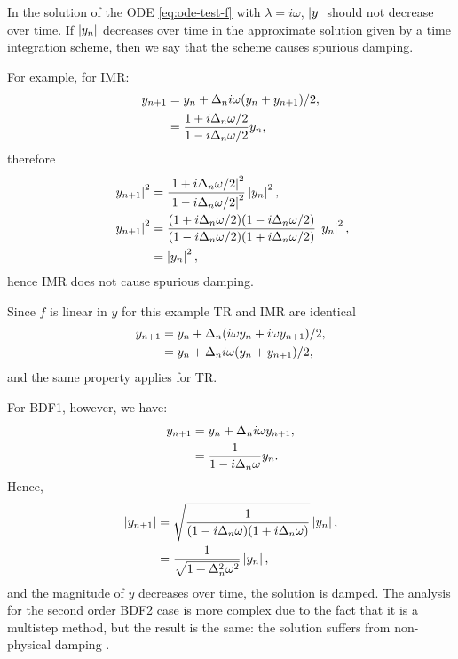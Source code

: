 In the solution of the ODE \cref{eq:ode-test-f} with $\lambda = i\omega$, $\left|{y} \right|$ should not decrease over time.
If $\left|{y_n} \right|$ decreases over time in the approximate solution given by a time integration scheme, then we say that the scheme causes spurious damping.

For example, for IMR:
\begin{equation}
  \begin{aligned}
    y_{n+1} &= y_n + \Delta_{n} i \omega (y_n + y_{n+1})/2, \\
    &= \frac{1 + i\Delta_{n} \omega/2}{1 - i\Delta_{n} \omega/2} y_n,
  \end{aligned}
\end{equation}
therefore
\begin{equation}
  \begin{aligned}
    \left|{y_{n+1}} \right|^2 &=  \frac{\left|{1 + i\Delta_{n} \omega/2} \right|^2}{\left|{1 - i\Delta_{n} \omega/2} \right|^2} \left|{y_n} \right|^2, \\
    \left|{y_{n+1}} \right|^2 &=  \frac{(1 + i\Delta_{n} \omega/2)(1 - i\Delta_{n} \omega/2)}
    {(1 - i\Delta_{n} \omega/2)(1 + i\Delta_{n} \omega/2)} \left|{y_n} \right|^2, \\
    &=  \left|{y_n} \right|^2,
  \end{aligned}
\end{equation}
hence IMR does not cause spurious damping.

Since $f$ is linear in $y$ for this example TR and IMR are identical
\begin{equation}
  \begin{aligned}
    y_{n+1} &= y_n + \Delta_{n}(i\omega y_n + i\omega y_{n+1})/2, \\
    &= y_n + \Delta_{n} i \omega (y_n + y_{n+1})/2,
  \end{aligned} 
\end{equation}
and the same property applies for TR.

For BDF1, however, we have:
\begin{equation}
  \begin{aligned}
    y_{n+1} &= y_n + \Delta_{n} i \omega y_{n+1}, \\
    &= \frac{1}{1 - i \Delta_{n} \omega} y_n.
  \end{aligned}
\end{equation}
Hence,
\begin{equation}
  \begin{aligned}
    \left|{y_{n+1}} \right| &= \sqrt{ \frac{1}{(1 - i \Delta_{n} \omega)(1 + i \Delta_{n} \omega)}} \left|{y_n} \right|, \\
    &= \frac{1}{\sqrt{1 + \Delta_{n}^2 \omega^2}} \left|{y_n} \right|, \\
  \end{aligned}
\end{equation}
and the magnitude of $y$ decreases over time, \ie the solution is damped.
The analysis for the second order BDF2 case is more complex due to the fact that it is a multistep method, but the result is the same: the solution suffers from non-physical damping \cite[265]{GreshoSani}.


